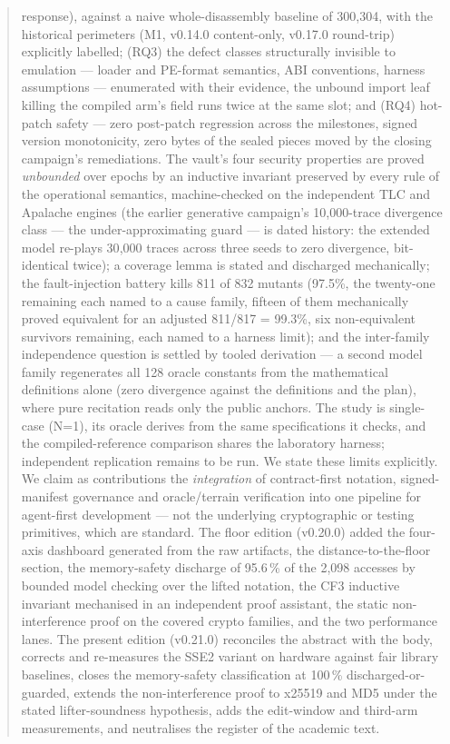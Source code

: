 \documentclass[11pt,a4paper]{article}
\begin{document}
\begin{abstract}
response), against a naive whole-disassembly baseline of 300{,}304, with
the historical perimeters (M1, v0.14.0 content-only, v0.17.0 round-trip)
explicitly labelled; (RQ3) the defect classes structurally invisible to
emulation --- loader and PE-format semantics, ABI conventions, harness
assumptions --- enumerated with their evidence, the unbound import leaf
killing the compiled arm's field runs twice at the same slot; and (RQ4)
hot-patch safety --- zero post-patch regression across the milestones,
signed version monotonicity, zero bytes of the sealed pieces moved by the
closing campaign's remediations. The vault's four security properties are
proved \emph{unbounded} over epochs by an inductive invariant preserved by
every rule of the operational semantics, machine-checked on the
independent TLC and Apalache engines (the earlier generative campaign's
10{,}000-trace divergence class --- the under-approximating guard --- is
dated history: the extended model re-plays 30{,}000 traces across three
seeds to zero divergence, bit-identical twice); a coverage lemma is stated
and discharged mechanically; the fault-injection battery kills 811 of 832
mutants (97.5\%, the twenty-one remaining each named to a cause family,
fifteen of them mechanically proved equivalent for an adjusted 811/817 =
99.3\%, six non-equivalent survivors remaining, each named to a harness
limit); and the inter-family independence question is settled by tooled
derivation --- a second model family regenerates all 128 oracle constants
from the mathematical definitions alone (zero divergence against the
definitions and the plan), where pure recitation reads only the public
anchors. The study is single-case (N=1), its oracle derives from the same
specifications it checks, and the compiled-reference comparison shares the
laboratory harness; independent replication remains to be run. We state
these limits explicitly. We claim as contributions the \emph{integration}
of contract-first notation, signed-manifest governance and oracle/terrain
verification into one pipeline for agent-first development --- not the
underlying cryptographic or testing primitives, which are standard. The floor edition (v0.20.0) added the four-axis dashboard generated
from the raw artifacts, the distance-to-the-floor section, the
memory-safety discharge of 95.6\,\% of the 2{,}098 accesses by bounded
model checking over the lifted notation, the CF3 inductive invariant
mechanised in an independent proof assistant, the static
non-interference proof on the covered crypto families, and the two
performance lanes. The present edition (v0.21.0) reconciles the
abstract with the body, corrects and re-measures the SSE2 variant on
hardware against fair library baselines, closes the memory-safety
classification at 100\,\% discharged-or-guarded, extends the
non-interference proof to x25519 and MD5 under the stated
lifter-soundness hypothesis, adds the edit-window and third-arm
measurements, and neutralises the register of the academic text.

\end{abstract}
\end{document}
